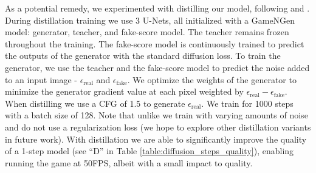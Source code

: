 \documentclass{article} %
\begin{document}
As a potential remedy, we experimented with distilling our model, following \cite{wang2023prolificdreamer} and \cite{yin2024onestep}. During distillation training we use 3 U-Nets, all initialized with a GameNGen model: generator, teacher, and fake-score model. The teacher remains frozen throughout the training. The fake-score model is continuously trained to predict the outputs of the generator with the standard diffusion loss. To train the generator, we use the teacher and the fake-score model to predict the noise added to an input image - $\epsilon_{\text{real}}$ and $\epsilon_{\text{fake}}$. We optimize the weights of the generator to minimize the generator gradient value at each pixel weighted by $\epsilon_{\text{real}} - \epsilon_{\text{fake}}$. When distilling we use a CFG of 1.5 to generate $\epsilon_{\text{real}}$. We train for 1000 steps with a batch size of 128. Note that unlike \cite{yin2024onestep} we train with varying amounts of noise and do not use a regularization loss (we hope to explore other distillation variants in future work). With distillation we are able to significantly improve the quality of a 1-step model (see ``D'' in Table \ref{table:diffusion_steps_quality}), enabling running the game at 50FPS, albeit with a small impact to quality.

\label{appendix:ablate num sampling steps}
\begin{table}[h]
\caption{\textbf{Generation with Varying Sampling Steps.} We evaluate the generation quality of a GameNGen model with an increasing number of steps using PSNR and LPIPS metrics. ``D'' marks a 1-step distilled model.}
\label{table:diffusion_steps_quality}
\centering
\vspace{0.05in}
\end{table}
\end{document}
